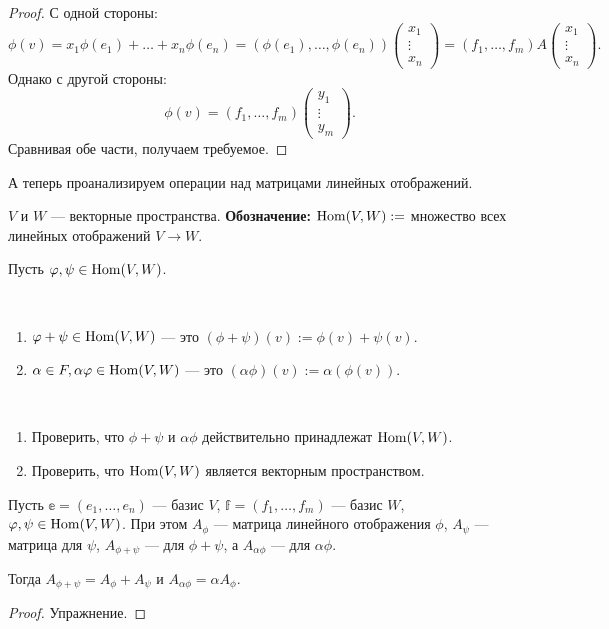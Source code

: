\begin{proof}
С одной стороны:
\[
\phi(v) = x_1 \phi(e_1) + \ldots + x_n\phi(e_n) = (\phi(e_1), \ldots, \phi(e_n))\begin{pmatrix*}x_1 \\ \vdots \\ x_n\end{pmatrix*} = (f_1, \ldots, f_m)A\begin{pmatrix*}x_1 \\ \vdots \\ x_n\end{pmatrix*}.
\]
Однако с другой стороны:
\[
\phi(v) = (f_1, \ldots, f_m)\begin{pmatrix*}y_1 \\ \vdots \\ y_m\end{pmatrix*}.
\]
Сравнивая обе части, получаем требуемое.
\end{proof}

А теперь проанализируем операции над матрицами линейных отображений.

$V$ и $W$ --- векторные пространства. \textbf{Обозначение:} $\mathrm{Hom}(V, W):=$ множество всех линейных отображений $V \rightarrow W$.

Пусть $\varphi, \psi \in \mathrm{Hom}(V, W)$.

\begin{Def}\ 
\begin{enumerate}
\item $\varphi + \psi \in \mathrm{Hom}(V, W)$ --- это $(\phi + \psi)(v):= \phi(v) + \psi(v)$.
\item $\alpha \in F, \alpha\varphi \in \mathrm{Hom}(V, W)$ --- это $(\alpha\phi)(v) := \alpha(\phi(v))$.
\end{enumerate}
\end{Def}

\begin{Task}\
\begin{enumerate}
\item Проверить, что $\phi + \psi$ и $\alpha\phi$ действительно принадлежат $\mathrm{Hom}(V, W)$.
\item Проверить, что $\mathrm{Hom}(V, W)$ является векторным пространством.
\end{enumerate}
\end{Task}

\begin{Suggestion}
Пусть $\mathbb{e} = (e_1, \ldots, e_n)$ --- базис $V$, $\mathbb{f} = (f_1, \ldots, f_m)$ --- базис $W$, $\varphi, \psi \in \mathrm{Hom}(V, W)$. При этом $A_{\phi}$ --- матрица линейного отображения $\phi$, $A_{\psi}$ --- матрица для $\psi$, $A_{\phi+\psi}$ --- для $\phi + \psi$, а $A_{\alpha\phi}$ --- для $\alpha\phi$.

Тогда $A_{\phi+\psi} = A_{\phi} + A_{\psi}$ и $A_{\alpha\phi} = \alpha A_{\phi}$.
\end{Suggestion}
\begin{proof}
Упражнение.
\end{proof}

